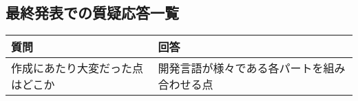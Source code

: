 \documentclass[a4paper,12pt]{jsarticle}
\begin{document}
\subsection{最終発表での質疑応答一覧}

\begin{table}[H]
	\begin{tabular}{|l|l|} \hline
		{\bf 質問} & {\bf 回答} \\ \hline \hline
		作成にあたり大変だった点はどこか & 開発言語が様々である各パートを組み合わせる点\\ \hline
	\end{tabular}
\end{table}
\end{document}
